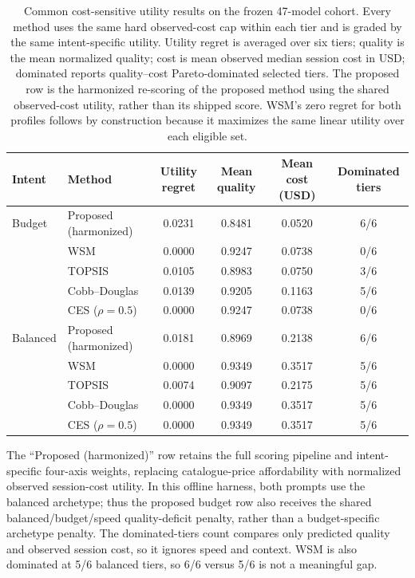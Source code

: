 \documentclass[pdflatex,sn-mathphys-num]{sn-jnl}
\theoremstyle{thmstyleone}
\theoremstyle{thmstylethree}
\begin{document}
\begin{table}[!htbp]
\caption{Common cost-sensitive utility results on the frozen 47-model cohort. Every method uses the same hard observed-cost cap within each tier and is graded by the same intent-specific utility. Utility regret is averaged over six tiers; quality is the mean normalized quality; cost is mean observed median session cost in USD; dominated reports quality--cost Pareto-dominated selected tiers. The proposed row is the harmonized re-scoring of the proposed method using the shared observed-cost utility, rather than its shipped score. WSM's zero regret for both profiles follows by construction because it maximizes the same linear utility over each eligible set.}
\label{tab:shared_utility}
\centering
\footnotesize
\setlength{\tabcolsep}{4pt}
\begin{tabular*}{\linewidth}{@{\extracolsep{\fill}}llcccc@{}}
\toprule
\textbf{Intent} & \textbf{Method} & \textbf{Utility regret} & \textbf{Mean quality} & \textbf{Mean cost (USD)} & \textbf{Dominated tiers} \\
\midrule
Budget & Proposed (harmonized) & 0.0231 & 0.8481 & 0.0520 & 6/6 \\
       & WSM                   & 0.0000 & 0.9247 & 0.0738 & 0/6 \\
       & TOPSIS                & 0.0105 & 0.8983 & 0.0750 & 3/6 \\
       & Cobb--Douglas         & 0.0139 & 0.9205 & 0.1163 & 5/6 \\
       & CES ($\rho=0.5$)      & 0.0000 & 0.9247 & 0.0738 & 0/6 \\
\midrule
Balanced & Proposed (harmonized) & 0.0181 & 0.8969 & 0.2138 & 6/6 \\
         & WSM                   & 0.0000 & 0.9349 & 0.3517 & 5/6 \\
         & TOPSIS                & 0.0074 & 0.9097 & 0.2175 & 5/6 \\
         & Cobb--Douglas         & 0.0000 & 0.9349 & 0.3517 & 5/6 \\
         & CES ($\rho=0.5$)      & 0.0000 & 0.9349 & 0.3517 & 5/6 \\
\bottomrule
\end{tabular*}
\end{table}

The ``Proposed (harmonized)'' row retains the full scoring pipeline and intent-specific four-axis weights, replacing catalogue-price affordability with normalized observed session-cost utility. In this offline harness, both prompts use the balanced archetype; thus the proposed budget row also receives the shared balanced/budget/speed quality-deficit penalty, rather than a budget-specific archetype penalty. The dominated-tiers count compares only predicted quality and observed session cost, so it ignores speed and context. WSM is also dominated at 5/6 balanced tiers, so 6/6 versus 5/6 is not a meaningful gap.
\end{document}
